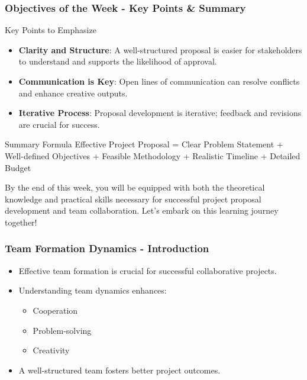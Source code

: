 \documentclass[aspectratio=169]{beamer}
\begin{document}
\begin{frame}[fragile]
    \frametitle{Objectives of the Week - Key Points & Summary}
    \begin{block}{Key Points to Emphasize}
        \begin{itemize}
            \item \textbf{Clarity and Structure}: A well-structured proposal is easier for stakeholders to understand and supports the likelihood of approval.
            \item \textbf{Communication is Key}: Open lines of communication can resolve conflicts and enhance creative outputs.
            \item \textbf{Iterative Process}: Proposal development is iterative; feedback and revisions are crucial for success.
        \end{itemize}
    \end{block}

    \begin{block}{Summary Formula}
        Effective Project Proposal = Clear Problem Statement + Well-defined Objectives + Feasible Methodology + Realistic Timeline + Detailed Budget
    \end{block}

    By the end of this week, you will be equipped with both the theoretical knowledge and practical skills necessary for successful project proposal development and team collaboration. Let’s embark on this learning journey together!
\end{frame}

\begin{frame}[fragile]
    \frametitle{Team Formation Dynamics - Introduction}
    \begin{itemize}
        \item Effective team formation is crucial for successful collaborative projects.
        \item Understanding team dynamics enhances:
            \begin{itemize}
                \item Cooperation
                \item Problem-solving
                \item Creativity
            \end{itemize}
        \item A well-structured team fosters better project outcomes.
    \end{itemize}
\end{frame}
\end{document}
